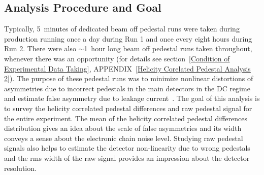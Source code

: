 %
%

\subsection{Analysis Procedure and Goal}
\label{Analysis Procedure and Goal}
Typically, 5~minutes of dedicated beam off pedestal runs were taken during production running once a day during Run 1 and once every eight hours during Run 2. There were also $\sim$1~hour long beam off pedestal runs taken throughout, whenever there was an opportunity (for details see section~\ref{Condition of Experimental Data Taking}, APPENDIX~\ref{Helicity Corelated Pedestal Analysis 2}).
The purpose of these pedestal runs was to minimize nonlinear distortions of asymmetries due to incorrect pedestals in the main detectors in the DC regime and estimate false asymmetry due to leakage current~\cite{leacock_hel_cor_ped_ana, leacock_qweak}. 
The goal of this analysis is to survey the helicity correlated pedestal differences and raw pedestal signal for the entire experiment. The mean of the helicity correlated pedestal differences distribution gives an idea about the scale of false asymmetries and its width conveys a sense about the electronic chain noise level. Studying raw pedestal signals also helps to estimate the detector non-linearity due to wrong pedestals and the rms width of the raw signal provides an impression about the detector resolution. 


